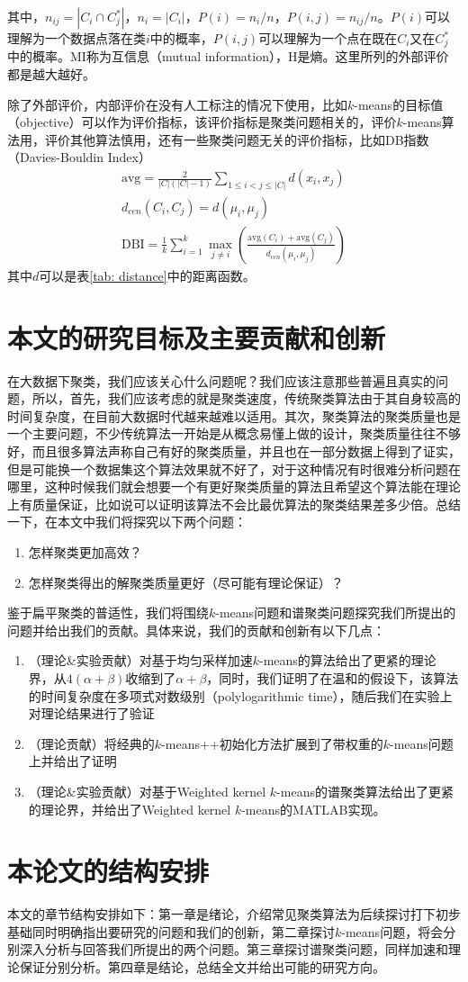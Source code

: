 其中，$n_{ij}=|C_i \cap C_j^*|$，$n_i = |C_i|$，$P(i) = n_i/n$，$P(i,j)=n_{ij}/n$。$P(i)$可以理解为一个数据点落在类$i$中的概率，$P(i,j)$可以理解为一个点在既在$C_i$又在$C_j^*$中的概率。MI称为互信息（mutual information），H是熵。这里所列的外部评价都是越大越好。

除了外部评价，内部评价在没有人工标注的情况下使用，比如$k$-means的目标值（objective）可以作为评价指标，该评价指标是聚类问题相关的，评价$k$-means算法用，评价其他算法慎用，还有一些聚类问题无关的评价指标，比如DB指数（Davies-Bouldin Index）
\begin{gather*}
    \text{avg} = \frac{2}{|C|(|C|-1)}\sum_{1\leq i<j \leq |C| }d(x_i,x_j) \\
    d_{cen}(C_i,C_j) = d(\mu_i,\mu_j) \\
    \text{DBI} = \frac{1}{k}\sum_{i=1}^k \max_{j \neq i} (\frac{\text{avg}(C_i)+\text{avg}(C_j)}{d_{cen}(\mu_i,\mu_j)})
\end{gather*}
其中$d$可以是表\ref{tab: distance}中的距离函数。

\section{本文的研究目标及主要贡献和创新}
在大数据下聚类，我们应该关心什么问题呢？我们应该注意那些普遍且真实的问题，所以，首先，我们应该考虑的就是聚类速度，传统聚类算法由于其自身较高的时间复杂度，在目前大数据时代越来越难以适用。其次，聚类算法的聚类质量也是一个主要问题，不少传统算法一开始是从概念易懂上做的设计，聚类质量往往不够好，而且很多算法声称自己有好的聚类质量，并且也在一部分数据上得到了证实，但是可能换一个数据集这个算法效果就不好了，对于这种情况有时很难分析问题在哪里，这种时候我们就会想要一个有更好聚类质量的算法且希望这个算法能在理论上有质量保证，比如说可以证明该算法不会比最优算法的聚类结果差多少倍。总结一下，在本文中我们将探究以下两个问题：
\begin{enumerate}
    \item 怎样聚类更加高效？
    \item 怎样聚类得出的解聚类质量更好（尽可能有理论保证）？
\end{enumerate}
鉴于扁平聚类的普适性，我们将围绕$k$-means问题和谱聚类问题探究我们所提出的问题并给出我们的贡献。具体来说，我们的贡献和创新有以下几点：
\begin{enumerate}
    \item （理论\&实验贡献）对基于均匀采样加速$k$-means的算法给出了更紧的理论界，从$4(\alpha+\beta)$收缩到了$\alpha+\beta$，同时，我们证明了在温和的假设下，该算法的时间复杂度在多项式对数级别（polylogarithmic time），随后我们在实验上对理论结果进行了验证
    \item （理论贡献）将经典的$k$-means++初始化方法扩展到了带权重的$k$-means问题上并给出了证明
    \item （理论\&实验贡献）对基于Weighted kernel $k$-means的谱聚类算法给出了更紧的理论界，并给出了Weighted kernel $k$-means的MATLAB实现。
\end{enumerate}

\section{本论文的结构安排}
本文的章节结构安排如下：第一章是绪论，介绍常见聚类算法为后续探讨打下初步基础同时明确指出要研究的问题和我们的创新，第二章探讨$k$-means问题，将会分别深入分析与回答我们所提出的两个问题。第三章探讨谱聚类问题，同样加速和理论保证分别分析。第四章是结论，总结全文并给出可能的研究方向。